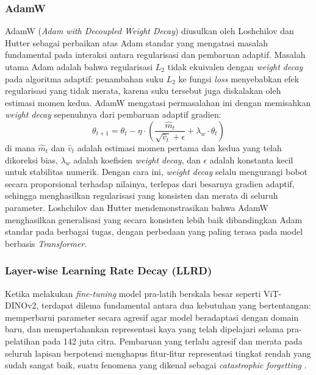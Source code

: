 \subsubsection{AdamW}
 
AdamW (\textit{Adam with Decoupled Weight Decay}) diusulkan oleh Loshchilov dan Hutter \cite{loshchilov2019adamw} sebagai perbaikan atas Adam standar yang mengatasi masalah fundamental pada interaksi antara regularisasi dan pembaruan adaptif. Masalah utama Adam adalah bahwa regularisasi $L_2$ tidak ekuivalen dengan \textit{weight decay} pada algoritma adaptif: penambahan suku $L_2$ ke fungsi \textit{loss} menyebabkan efek regularisasi yang tidak merata, karena suku tersebut juga diskalakan oleh estimasi momen kedua. AdamW mengatasi permasalahan ini dengan memisahkan \textit{weight decay} sepenuhnya dari pembaruan adaptif gradien:
\begin{equation}
    \theta_{t+1}
    = \theta_t
      - \eta \cdot \left(
          \frac{\hat{m}_t}{\sqrt{\hat{v}_t} + \epsilon}
          + \lambda_w \cdot \theta_t
        \right)
\end{equation}
di mana $\hat{m}_t$ dan $\hat{v}_t$ adalah estimasi momen pertama dan kedua yang telah dikoreksi bias, $\lambda_w$ adalah koefisien \textit{weight decay}, dan $\epsilon$ adalah konstanta kecil untuk stabilitas numerik. Dengan cara ini, \textit{weight decay} selalu mengurangi bobot secara proporsional terhadap nilainya, terlepas dari besarnya gradien adaptif, sehingga menghasilkan regularisasi yang konsisten dan merata di seluruh parameter. Loshchilov dan Hutter \cite{loshchilov2019adamw} mendemonstrasikan bahwa AdamW menghasilkan generalisasi yang secara konsisten lebih baik dibandingkan Adam standar pada berbagai tugas, dengan perbedaan yang paling terasa pada model berbasis \textit{Transformer}.
 
\subsubsection{Layer-wise Learning Rate Decay (LLRD)}
 
Ketika melakukan \textit{fine-tuning} model pra-latih berskala besar seperti ViT-DINOv2, terdapat dilema fundamental antara dua kebutuhan yang bertentangan: memperbarui parameter secara agresif agar model beradaptasi dengan domain baru, dan mempertahankan representasi kaya yang telah dipelajari selama pra-pelatihan pada 142 juta citra. Pembaruan yang terlalu agresif dan merata pada seluruh lapisan berpotensi menghapus fitur-fitur representasi tingkat rendah yang sudah sangat baik, suatu fenomena yang dikenal sebagai \textit{catastrophic forgetting} \cite{sun2019bert}.
 
